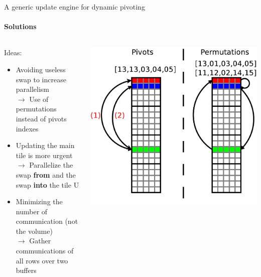 \begin{frame}{A generic update engine for dynamic pivoting}
\framesubtitle{Solutions}
\begin{columns}
\begin{column}{.60\textwidth}
Ideas:
\begin{itemize}
\item Avoiding useless swap to increase parallelism\\
$\rightarrow$ Use of permutations instead of pivots indexes
\item Updating the main tile is more urgent\\
$\rightarrow$ Parallelize the swap \textbf{from} and the swap \textbf{into} the tile U
\item Minimizing the number of communication (not the volume)\\
$\rightarrow$ Gather communications of all rows over two buffers
\end{itemize}
\end{column}
\begin{column}{.40\textwidth}
\begin{center}
\includegraphics[scale=0.3]{pivots.pdf}
\end{center}
\end{column}
\end{columns}
\end{frame}

